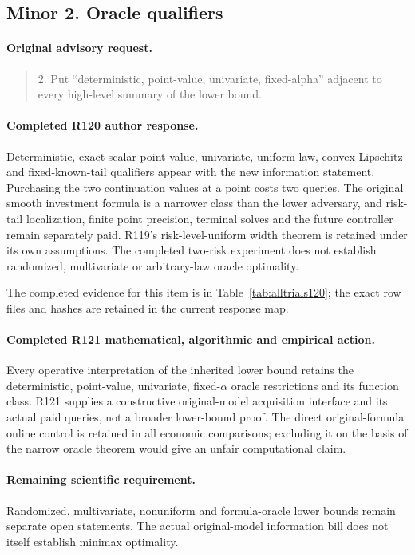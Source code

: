 \subsection{Minor 2. Oracle qualifiers}
\label{response121:minor-2}

\paragraph{Original advisory request.}
\begin{quote}
2. Put “deterministic, point-value, univariate, fixed-alpha” adjacent to every high-level summary of the lower bound.
\end{quote}

\paragraph{Completed R120 author response.}
Deterministic, exact scalar point-value, univariate, uniform-law, convex-Lipschitz and fixed-known-tail qualifiers appear with the new information statement. Purchasing the two continuation values at a point costs two queries. The original smooth investment formula is a narrower class than the lower adversary, and risk-tail localization, finite point precision, terminal solves and the future controller remain separately paid. R119's risk-level-uniform width theorem is retained under its own assumptions. The completed two-risk experiment does not establish randomized, multivariate or arbitrary-law oracle optimality.

The completed evidence for this item is in Table~\ref{tab:alltrials120}; the exact row files and hashes are retained in the current response map.

\paragraph{Completed R121 mathematical, algorithmic and empirical action.}
Every operative interpretation of the inherited lower bound retains the deterministic, point-value, univariate, fixed-$\alpha$ oracle restrictions and its function class. R121 supplies a constructive original-model acquisition interface and its actual paid queries, not a broader lower-bound proof. The direct original-formula online control is retained in all economic comparisons; excluding it on the basis of the narrow oracle theorem would give an unfair computational claim.

\paragraph{Remaining scientific requirement.}
Randomized, multivariate, nonuniform and formula-oracle lower bounds remain separate open statements. The actual original-model information bill does not itself establish minimax optimality.

